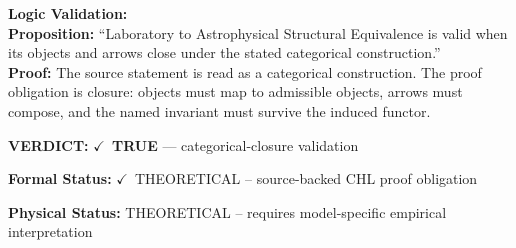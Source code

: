 \textbf{Logic Validation:}\\
\textbf{Proposition:} ``Laboratory  to  Astrophysical Structural Equivalence is valid when its objects and arrows
close under the stated categorical construction.''\\
\textbf{Proof:} The source statement is read as a categorical construction. The proof obligation is
closure: objects must map to admissible objects, arrows must compose, and the named
invariant must survive the induced functor.

\textbf{VERDICT:} \ensuremath{\checkmark}\ \textbf{TRUE} --- categorical-closure validation

\textbf{Formal Status:} \ensuremath{\checkmark}\ THEORETICAL -- source-backed CHL proof obligation

\textbf{Physical Status:} THEORETICAL -- requires model-specific empirical interpretation
\par\vspace{0.45em}
\par
\ifTZPDarkEdition
{}
\fi
\endgroup
\endgroup

